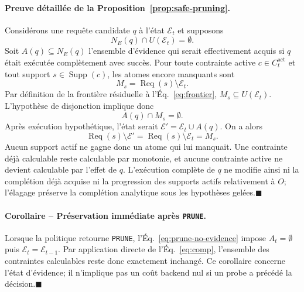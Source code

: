 \paragraph*{Preuve détaillée de la Proposition~\ref{prop:safe-pruning}.}
Considérons une requête candidate $q$ à l'état $\mathcal{E}_t$ et supposons
\[
N_E(q)\cap U(\mathcal{E}_t)=\emptyset.
\]
Soit $A(q)\subseteq N_E(q)$ l'ensemble d'évidence qui serait effectivement acquis si $q$ était exécutée complètement avec succès. Pour toute contrainte active $c\in C_t^{\mathrm{act}}$ et tout support $s\in\operatorname{Supp}(c)$, les atomes encore manquants sont
\[
M_s=\operatorname{Req}(s)\setminus\mathcal{E}_t.
\]
Par définition de la frontière résiduelle à l'Éq.~\eqref{eq:frontier}, $M_s\subseteq U(\mathcal{E}_t)$. L'hypothèse de disjonction implique donc
\[
A(q)\cap M_s=\emptyset.
\]
Après exécution hypothétique, l'état serait $\mathcal{E}'=\mathcal{E}_t\cup A(q)$. On a alors
\[
\operatorname{Req}(s)\setminus\mathcal{E}'
=
\operatorname{Req}(s)\setminus\mathcal{E}_t
=
M_s.
\]
Aucun support actif ne gagne donc un atome qui lui manquait. Une contrainte déjà calculable reste calculable par monotonie, et aucune contrainte active ne devient calculable par l'effet de $q$. L'exécution complète de $q$ ne modifie ainsi ni la complétion déjà acquise ni la progression des supports actifs relativement à $O$; l'élagage préserve la complétion analytique sous les hypothèses gelées.\unskip\nobreak\hspace{0.5em}$\blacksquare$

\paragraph*{Corollaire -- Préservation immédiate après \texttt{PRUNE}.}
Lorsque la politique retourne \texttt{PRUNE}, l'Éq.~\eqref{eq:prune-no-evidence} impose $A_t=\emptyset$ puis $\mathcal{E}_t=\mathcal{E}_{t-1}$. Par application directe de l'Éq.~\eqref{eq:comp}, l'ensemble des contraintes calculables reste donc exactement inchangé. Ce corollaire concerne l'état d'évidence; il n'implique pas un coût backend nul si un probe a précédé la décision.\unskip\nobreak\hspace{0.5em}$\blacksquare$

